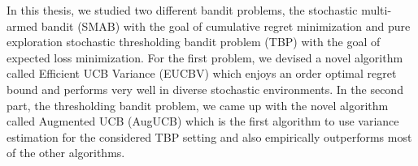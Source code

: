 In this thesis, we studied two different bandit problems, the stochastic multi-armed bandit (SMAB) with the goal of cumulative regret minimization and pure exploration stochastic thresholding bandit problem (TBP) with the goal of expected loss minimization. For the first problem, we devised a novel algorithm called Efficient UCB Variance (EUCBV) which enjoys an order optimal regret bound and performs very well in diverse stochastic environments. In the second part, the thresholding bandit problem, we came up with the novel algorithm called Augmented UCB (AugUCB) which is the first algorithm to use variance estimation for the considered TBP setting and also empirically outperforms most of the other algorithms. 


    

